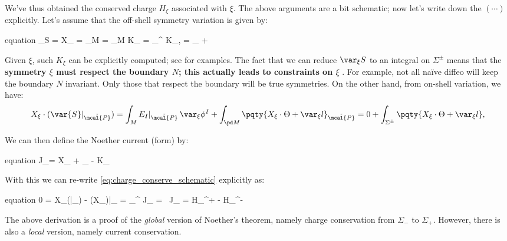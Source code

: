 \documentclass[a4paper
	,10pt
]{article}
\begin{document}
	We've thus obtained the conserved charge $H_\xi$ associated with $\xi$. The above arguments are a bit schematic; now let's write down the $({\cdots})$ explicitly. Let's assume that the off-shell symmetry variation is given by:
	\begin{empheq}{equation}
		\var_\xi S
		= X_\xi \cdot {}
		= \int_M 
		= \int_{\pd M} K_\xi
		= \int_{\Sigma^\pm} K_\xi,
	\quad
		= \var_ + 
	\label{eq:symmetry_var_action}
	\end{empheq}
	Given $\xi$, such $K_\xi$ can be explicitly computed; see \cite{Banados:2016zim,Harlow:2019yfa} for examples. The fact that we can reduce $\var_\xi S$ to an integral on $\Sigma^\pm$ means that the \textbf{symmetry $\xi$ must respect the boundary $N$; this actually leads to constraints on $\xi$} \cite{Harlow:2019yfa}. For example, not all na\"ive diffeo will keep the boundary $N$ invariant. Only those that respect the boundary will be true symmetries. 
	On the other hand, from on-shell variation, we have:
	\begin{equation}
		X_\xi \cdot (\var{S}|_{\tilde{\mcal{P}}})
		= \int_M E_I|_{\tilde{\mcal{P}}} \,\var_\xi {\phi^I}
			+ \int_{\pd M} \pqty{
				X_\xi \cdot \Theta + \var_\xi {l}
			}_{\tilde{\mcal{P}}}
		= 0 + \int_{\Sigma^\pm} \pqty{
				X_\xi \cdot \Theta + \var_\xi {l}
			},
	\end{equation}
	
\pagebreak[3]
	
	We can then define the Noether current (form) by:
	\begin{empheq}{equation}
		J_\xi = X_\xi \cdot \Theta
			+ \var_ - K_\xi
	\end{empheq}
	With this we can re-write \eqref{eq:charge_conserve_schematic} explicitly as:
	\begin{empheq}{equation}
		0 = X_\xi \cdot (|_{})
		- (X_\xi \cdot {})\big|_{}
		= \int_{\Sigma^\pm} J_\xi
		= \pqty{
				\int_{\Sigma^+} - \int_{\Sigma^-}
			}\, J_\xi
		= H_\xi^+ - H_\xi^-
	\label{eq:charge_conserve_global}
	\end{empheq}
	
	The above derivation is a proof of the \textit{global} version of Noether's theorem, namely charge conservation from $\Sigma_-$ to $\Sigma_+$. However, there is also a \textit{local} version, namely current conservation. 
	
\end{document}
